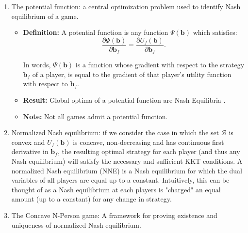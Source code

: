 \documentclass[12pt,a4paper]{report}
\begin{document}
\begin{enumerate}
\item The potential function: a central optimization problem used to identify Nash equilibrium of a game.
\begin{itemize}
\item
\textbf{Definition:}  A potential function is any function
$ \Psi(\mathbf{b})$ which satisfies:
\begin{equation}\label{potential_game_condition}
\frac{\partial \Psi(\mathbf{b})}{\partial \mathbf{b}_{f}}
 =
 \frac{\partial U_f(\mathbf{b})}{\partial \mathbf{b}_{f}}.
\end{equation} 

In words, $ \Psi(\mathbf{b})$ is a function whose gradient with respect to the strategy $\mathbf{b}_{f}$ of a player, is equal to the gradient of that player's utility function with respect to $\mathbf{b}_{f}$.

\item \textbf{Result:} Global optima of a potential function are Nash Equilibria \cite{monderer1996potential}.
\item \textbf{Note:} Not all games admit a potential function.


\end{itemize}

\item Normalized Nash equilibrium: if we consider the case in which the set $\mathcal{B}$ is convex and $U_f(\mathbf{b})$ is concave, non-decreasing and has continuous first derivative in $\mathbf{b}_{f}$, the resulting optimal strategy for each player (and thus any Nash equilibrium) will satisfy the necessary and sufficient KKT conditions. A normalized Nash equilibrium (NNE) is a Nash equilibrium for which the dual variables of all players are equal up to a constant. 
Intuitively, this can be thought of as a Nash equilibrium at each players is "charged" an equal amount (up to a constant) for any change in strategy.

\item The Concave N-Person game: A framework for proving existence and uniqueness of normalized Nash equilibrium.


\end{enumerate}
\end{document}
